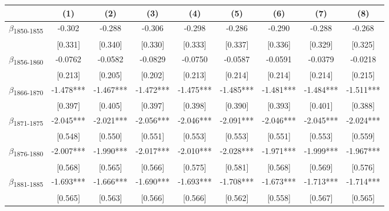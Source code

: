 {
\def\sym#1{\ifmmode^{#1}\else\(^{#1}\)\fi}
\begin{tabular}{l*{8}{c}}
\toprule
            &\multicolumn{1}{c}{(1)}   &\multicolumn{1}{c}{(2)}   &\multicolumn{1}{c}{(3)}   &\multicolumn{1}{c}{(4)}   &\multicolumn{1}{c}{(5)}   &\multicolumn{1}{c}{(6)}   &\multicolumn{1}{c}{(7)}   &\multicolumn{1}{c}{(8)}   \\
\midrule
$\beta$\textsubscript{1850-1855}&      -0.302   &      -0.288   &      -0.306   &      -0.298   &      -0.286   &      -0.290   &      -0.288   &      -0.268   \\
            &     [0.331]   &     [0.340]   &     [0.330]   &     [0.333]   &     [0.337]   &     [0.336]   &     [0.329]   &     [0.325]   \\
$\beta$\textsubscript{1856-1860}&     -0.0762   &     -0.0582   &     -0.0829   &     -0.0750   &     -0.0587   &     -0.0591   &     -0.0379   &     -0.0218   \\
            &     [0.213]   &     [0.205]   &     [0.202]   &     [0.213]   &     [0.214]   &     [0.214]   &     [0.214]   &     [0.215]   \\
$\beta$\textsubscript{1866-1870}&      -1.478***&      -1.467***&      -1.472***&      -1.475***&      -1.485***&      -1.481***&      -1.484***&      -1.511***\\
            &     [0.397]   &     [0.405]   &     [0.397]   &     [0.398]   &     [0.390]   &     [0.393]   &     [0.401]   &     [0.388]   \\
$\beta$\textsubscript{1871-1875}&      -2.045***&      -2.021***&      -2.056***&      -2.046***&      -2.091***&      -2.046***&      -2.045***&      -2.024***\\
            &     [0.548]   &     [0.550]   &     [0.551]   &     [0.553]   &     [0.553]   &     [0.551]   &     [0.553]   &     [0.559]   \\
$\beta$\textsubscript{1876-1880}&      -2.007***&      -1.990***&      -2.017***&      -2.010***&      -2.028***&      -1.971***&      -1.999***&      -1.967***\\
            &     [0.568]   &     [0.565]   &     [0.566]   &     [0.575]   &     [0.581]   &     [0.568]   &     [0.569]   &     [0.576]   \\
$\beta$\textsubscript{1881-1885}&      -1.693***&      -1.666***&      -1.690***&      -1.693***&      -1.708***&      -1.673***&      -1.713***&      -1.714***\\
            &     [0.565]   &     [0.563]   &     [0.566]   &     [0.566]   &     [0.562]   &     [0.558]   &     [0.567]   &     [0.565]   \\

\end{tabular}}
